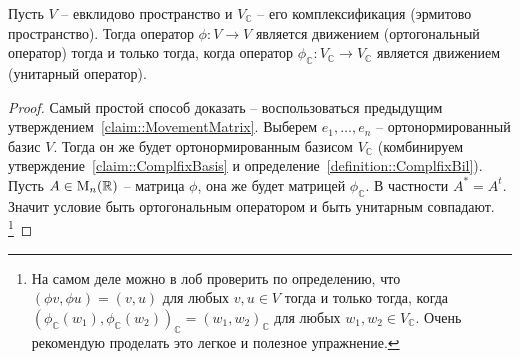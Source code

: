 \begin{claim}
\label{claim::MovementComplfix}
Пусть $V$ -- евклидово пространство и $V_\mathbb C$ -- его комплексификация (эрмитово пространство).
Тогда оператор $\phi \colon V\to V$ является движением (ортогональный оператор) тогда и только тогда, когда оператор $\phi_\mathbb C\colon V_\mathbb C\to V_\mathbb C$ является движением (унитарный оператор).
\end{claim}
\begin{proof}
Самый простой способ доказать -- воспользоваться предыдущим утверждением~\ref{claim::MovementMatrix}.
Выберем $e_1,\ldots,e_n$ -- ортонормированный базис $V$.
Тогда он же будет ортонормированным базисом $V_\mathbb C$ (комбинируем утверждение~\ref{claim::ComplfixBasis} и определение~\ref{definition::ComplfixBil}).
Пусть $A\in\operatorname{M}_{n}(\mathbb R)$ -- матрица $\phi$, она же будет матрицей $\phi_\mathbb C$.
В частности $A^* = A^t$.
Значит условие быть ортогональным оператором и быть унитарным совпадают.%
\footnote{На самом деле можно в лоб проверить по определению, что $(\phi v, \phi u) = (v, u)$ для любых $v,u\in V$ тогда и только тогда, когда $(\phi_\mathbb C(w_1), \phi_\mathbb C(w_2))_\mathbb C = (w_1,w_2)_\mathbb C$ для любых $w_1,w_2\in V_\mathbb C$.
Очень рекомендую проделать это легкое и полезное упражнение.}
\end{proof}

